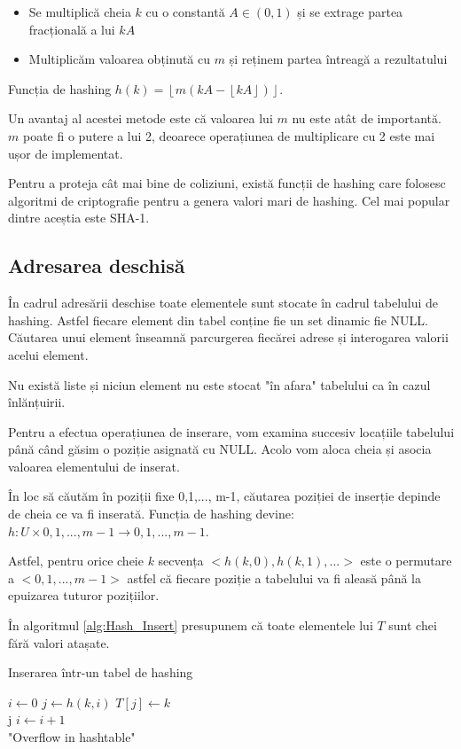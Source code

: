 \begin{itemize}
\item {Se multiplică cheia $k$ cu o constantă $A \in (0,1)$ și se extrage partea fracțională a lui $kA$} 
\item {Multiplicăm valoarea obținută cu $m$ și reținem partea întreagă a rezultatului}
\end{itemize}

Funcția de hashing $h(k)=\left \lfloor m(kA -\left \lfloor kA \right \rfloor) \right \rfloor$.

Un avantaj al acestei metode este că valoarea lui $m$ nu este atât de importantă. $m$ poate fi o putere a lui 2, deoarece operațiunea de multiplicare cu 2 este mai ușor de implementat.

Pentru a proteja cât mai bine de coliziuni, există funcții de hashing care folosesc algoritmi de criptografie pentru a genera valori mari de hashing. Cel mai popular dintre aceștia este SHA-1\cite{Wang2005}.

\subsection{Adresarea deschisă}

În cadrul adresării deschise toate elementele sunt stocate în cadrul tabelului de hashing. Astfel fiecare element din tabel conține fie un set dinamic fie NULL. Căutarea unui element înseamnă parcurgerea fiecărei adrese și interogarea valorii acelui element. 

Nu există liste și niciun element nu este stocat "în afara" tabelului ca în cazul înlănțuirii. 

Pentru a efectua operațiunea de inserare, vom examina succesiv locațiile tabelului până când găsim o poziție asignată cu NULL. Acolo vom aloca cheia și asocia valoarea elementului de inserat.

În loc să căutăm în poziții fixe 0,1,..., m-1, căutarea poziției de inserție depinde de cheia ce va fi inserată. Funcția de hashing devine:
$h:U  \times {0,1,...,m-1} \rightarrow {0,1,...,m-1}$.

Astfel, pentru orice cheie $k$ secvența $<h(k,0), h(k,1), ...>$ este o permutare a $<0,1,...,m-1>$ astfel că fiecare poziție a tabelului va fi aleasă până la epuizarea tuturor pozițiilor.

În algoritmul \ref{alg:Hash_Insert} presupunem că toate elementele lui $T$ sunt chei fără valori atașate.


\begin{algorithm} [H]
	\caption{Inserarea într-un tabel de hashing}\label{alg:Hash_Insert}
	\begin{algorithmic}[1]
		\State $i \gets 0$		
		\State $j \gets h(k,i)$		
		\State $T[j] \gets k$\\
		\tab{}\tab{}\Return j
		\Else
		\State $i \gets i+1$		
		\EndIf
		\EndWhile \\	
		\Return "Overflow in hashtable"
		\EndProcedure
	\end{algorithmic}
\end{algorithm}

